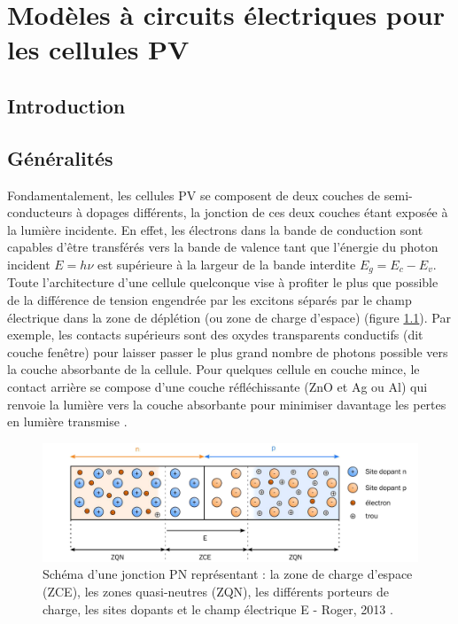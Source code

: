\chapter{Modèles à circuits électriques pour les cellules PV}

\section{Introduction}

\section{Généralités}

Fondamentalement, les cellules PV se composent de deux couches de semi-conducteurs à dopages différents, la jonction de ces deux couches étant exposée à la lumière incidente. En effet, les électrons dans la bande de conduction sont capables d'être transférés vers la bande de valence tant que l'énergie du photon incident $E = h \nu$ est supérieure à la largeur de la bande interdite $E_g = E_c - E_v$. Toute l'architecture d'une cellule quelconque vise à profiter le plus que possible de la différence de tension engendrée par les excitons séparés par le champ électrique dans la zone de déplétion (ou zone de charge d'espace) (figure \ref{fig:pn}). Par exemple, les contacts supérieurs sont des oxydes transparents conductifs (dit couche fenêtre) pour laisser passer le plus grand nombre de photons possible vers la couche absorbante de la cellule. Pour quelques cellule en couche mince, le contact arrière se compose d'une couche réfléchissante (ZnO et Ag ou Al) qui renvoie la lumière vers la couche absorbante pour minimiser davantage les pertes en lumière transmise \cite{Chopra2004}.

\begin{figure}
  \begin{center}
    \includegraphics[width=.7\textwidth]{resources/pn.PNG}
    \caption{Schéma d'une jonction PN représentant : la zone de charge d'espace
(ZCE), les zones quasi-neutres (ZQN), les différents porteurs de charge, les sites dopants et le champ électrique E - Roger, 2013 \cite{Roger2013}.}
    \label{fig:pn}
  \end{center}
\end{figure}  


